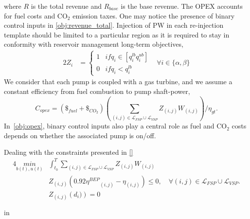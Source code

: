     where $R$ is the total revenue and $R_{base}$ is the base revenue. The OPEX accounts for fuel costs and CO$_2$ emission taxes. One may notice the presence of binary control inputs in \eqref{obj:revenue_total}. Injection of PW in each re-injection template should be limited to a particular region as it is required to stay in conformity with reservoir management long-term objectives,
    \begin{alignat}{2}
        Z_i &= \left\{\begin{array}{clc} 1 & if q_i \in \left[q^{lb}_i q^{ub}_i\right] & \\ 0 & if q_i < q^{lb}_i & \end{array} \right. \forall i \in \{\alpha, \beta\}
    \end{alignat}
    We consider that each pump is coupled with a gas turbine, and we assume a constant efficiency from fuel combustion to pump shaft-power,
    \begin{equation}
        C_{opex} = \left(\$_{fuel} + \$_{CO_2}\right)\left(\sum_{(i,j)\in{\mathcal{L}_{FSP}\cup \mathcal{L}_{VSP}}} Z_{(i,j)}W_{(i,j)} \right)/ \eta_{gt}. \label{obj:opex}
    \end{equation}
    In~\eqref{obj:opex}, binary control inputs also play a central role as fuel and CO$_2$ costs depends on whether the associated pump is on/off.


    \par Dealing with the constraints presented in \eqref{}
    \begin{alignat}{4}
        \underset{b(t),u(t)}{min}& \int_{t_0}^{T} \sum_{(i,j)\in\mathcal{L}_{FSP} \cup \mathcal{L}_{VSP}} Z_{(i,j)}W_{(i,j)}
        \\
        &Z_{(i,j)}\left(0.92{\eta^{BEP}}_{(i,j)} - \eta_{(i,j)}\right) \leq 0, \quad \forall (i,j) \in \mathcal{L}_{FSP}\cup \mathcal{L}_{VSP}. \label{efficiency_operation}
        \\ 
        &Z_{(i,j)}\left(d_{i})\right) = 0 \label{long_term}
        \\
        \\
    \end{alignat}
    in 

    

